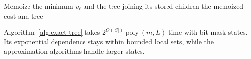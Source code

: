 \begin{algorithm}[H]
\caption{Exact supplied-query Bellman recursion (small local states)}
\label{alg:exact-tree}
Memoize the minimum $v_\ell$ and the tree joining its stored children\;
\KwRet the memoized cost and tree\;
\end{algorithm}

Algorithm~\ref{alg:exact-tree} takes $2^{O(|S|)}\operatorname{poly}(m,L)$
time with bit-mask states. Its exponential dependence stays within
bounded local sets, while the approximation algorithms handle larger
states.
